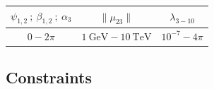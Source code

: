 \begin{table}[H]
\centering
\begin{tabular}{ccc}
$\psi_{1,2} \ ; \ \beta_{1,2} \ ;\  \alpha_3 $ & $\|\mu_{23}\|$ & $\lambda_{3-10}$ \\ \hline
$0- 2\pi$    & $1 \ \text{GeV} - 10 \ \text{TeV}$                                 & $10^{-7} - 4\pi$      
\end{tabular}
\end{table}

\subsection{Constraints}

